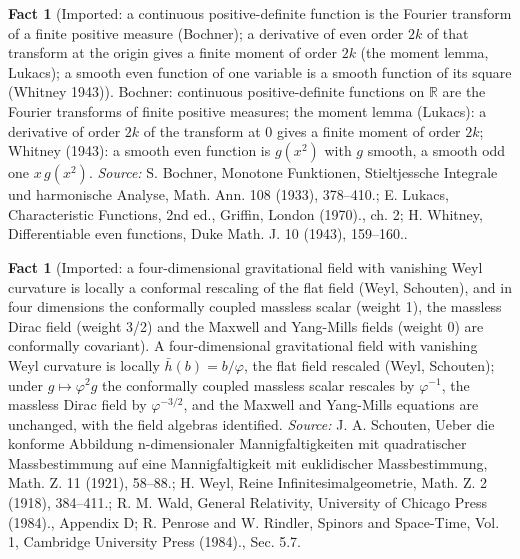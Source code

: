 \documentclass[11pt]{article}
\theoremstyle{definition}
\newtheorem{fact}[theorem]{Fact}
\theoremstyle{plain}
\providecommand{\R}{}\renewcommand{\R}{\mathbb{R}}
\providecommand{\hb}{}\renewcommand{\hb}{\bar{h}}
\begin{document}
\begin{fact}[Imported: a continuous positive-definite function is the Fourier transform of a finite positive measure (Bochner); a derivative of even order $2k$ of that transform at the origin gives a finite moment of order $2k$ (the moment lemma, Lukacs); a smooth even function of one variable is a smooth function of its square (Whitney 1943)]\label{c:synthesis.imported-bochner-theorem-moment-lemma-and-whitney-even-functions}
Bochner: continuous positive-definite functions on $\R$ are the Fourier transforms of finite positive measures; the moment lemma (Lukacs): a derivative of order $2k$ of the transform at $0$ gives a finite moment of order $2k$; Whitney (1943): a smooth even function is $g(x^{2})$ with $g$ smooth, a smooth odd one $x\,g(x^{2})$.
\emph{Source:} S. Bochner, Monotone Funktionen, Stieltjessche Integrale und harmonische Analyse, Math. Ann. 108 (1933), 378--410.; E. Lukacs, Characteristic Functions, 2nd ed., Griffin, London (1970)., ch. 2; H. Whitney, Differentiable even functions, Duke Math. J. 10 (1943), 159--160..
\end{fact}

\begin{fact}[Imported: a four-dimensional gravitational field with vanishing Weyl curvature is locally a conformal rescaling of the flat field (Weyl, Schouten), and in four dimensions the conformally coupled massless scalar (weight 1), the massless Dirac field (weight 3/2) and the Maxwell and Yang-Mills fields (weight 0) are conformally covariant]\label{c:synthesis.imported-conformal-covariance-of-massless-fields-and-local-conformal-flatness}
A four-dimensional gravitational field with vanishing Weyl curvature is locally $\hb(b) = b/\varphi$, the flat field rescaled (Weyl, Schouten); under $g \mapsto \varphi^{2}g$ the conformally coupled massless scalar rescales by $\varphi^{-1}$, the massless Dirac field by $\varphi^{-3/2}$, and the Maxwell and Yang-Mills equations are unchanged, with the field algebras identified.
\emph{Source:} J. A. Schouten, Ueber die konforme Abbildung n-dimensionaler Mannigfaltigkeiten mit quadratischer Massbestimmung auf eine Mannigfaltigkeit mit euklidischer Massbestimmung, Math. Z. 11 (1921), 58--88.; H. Weyl, Reine Infinitesimalgeometrie, Math. Z. 2 (1918), 384--411.; R. M. Wald, General Relativity, University of Chicago Press (1984)., Appendix D; R. Penrose and W. Rindler, Spinors and Space-Time, Vol. 1, Cambridge University Press (1984)., Sec. 5.7.
\end{fact}
\end{document}
